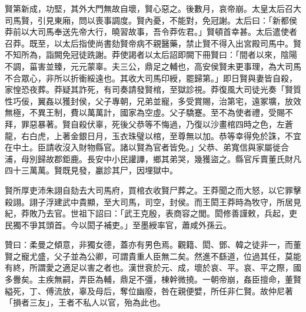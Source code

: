 \begin{pinyinscope}
賢第新成，功堅，其外大門無故自壞，賢心惡之。後數月，哀帝崩。太皇太后召大司馬賢，引見東廂，問以喪事調度。賢內憂，不能對，免冠謝。太后曰：「新都侯莽前以大司馬奉送先帝大行，曉習故事，吾令莽佐君。」賢頓首幸甚。太后遣使者召莽。既至，以太后指使尚書劾賢帝病不親醫藥，禁止賢不得入出宮殿司馬中。賢不知所為，詣闕免冠徒跣謝。莽使謁者以太后詔即闕下冊賢曰：「間者以來，陰陽不調，菑害並臻，元元蒙辜。夫三公，鼎足之輔也，高安侯賢未更事理，為大司馬不合眾心，非所以折衝綏遠也。其收大司馬印綬，罷歸第。」即日賢與妻皆自殺，家惶恐夜葬。莽疑其詐死，有司奏請發賢棺，至獄診視。莽復風大司徒光奏「賢質性巧佞，翼姦以獲封侯，父子專朝，兄弟並寵，多受賞賜，治第宅，遠冢壙，放效無極，不異王制，費以萬萬計，國家為空虛。父子驕蹇。至不為使者禮，受賜不拜，罪惡暴著。賢自殺伏辜，死後父恭等不悔過，乃復以沙畫棺四時之色，左蒼龍，右白虎，上著金銀日月，玉衣珠璧以棺，至尊無以加。恭等幸得免於誅，不宜在中土。臣請收沒入財物縣官。諸以賢為官者皆免。」父恭、弟寬信與家屬徙合浦，母別歸故郡鉅鹿。長安中小民讙譁，鄉其弟哭，幾獲盜之。縣官斥賣董氏財凡四十三萬萬。賢既見發，臝診其尸，因埋獄中。

賢所厚吏沛朱詡自劾去大司馬府，買棺衣收賢尸葬之。王莽聞之而大怒，以它罪擊殺詡。詡子浮建武中貴顯，至大司馬，司空，封侯。而王閎王莽時為牧守，所居見紀，莽敗乃去官。世祖下詔曰：「武王克殷，表商容之閭。閎修善謹敕，兵起，吏民獨不爭其頭首。今以閎子補吏。」至墨綬率官，蕭咸外孫云。

贊曰：柔曼之傾意，非獨女德，蓋亦有男色焉。觀籍、閎、鄧、韓之徒非一，而董賢之寵尤盛，父子並為公卿，可謂貴重人臣無二矣。然進不繇道，位過其任，莫能有終，所謂愛之適足以害之者也。漢世衰於元、成，壞於哀、平。哀、平之際，國多釁矣。主疾無嗣，弄臣為輔，鼎足不彊，棟幹微撓。一朝帝崩，姦臣擅命，董賢縊死，丁、傅流放，辜及母后，奪位幽廢，咎在親便嬖，所任非仁賢。故仲尼著「損者三友」，王者不私人以官，殆為此也。


\end{pinyinscope}